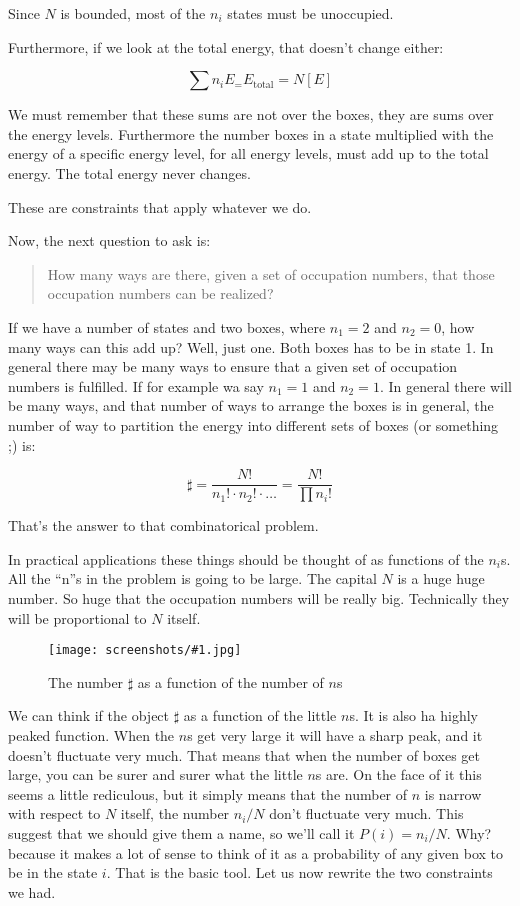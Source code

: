 \documentclass[a4, 12pt, english, USenglish]{scrreprt}
\newcommand{\screenshot}[2]{
\begin{figure}[htb]
\texttt{[image: screenshots/\#1.jpg]}
\label{#1}
\caption{#2}
\end{figure}}
\newcommand{\brackets}[1]{\ensuremath{\left[{#1}\right]}}
\begin{document}
Since \(N\) is bounded, most of the \(n_i\) states must be unoccupied.

Furthermore, if we look at the total energy, that doesn't change
either:

\[
\sum n_i E_ = E_{\mbox{total}} = N \brackets{E}
\]

We must remember that these sums are not over the boxes, they are sums
over the energy levels.  Furthermore the number boxes in a state multiplied
with the energy of a specific energy level, for all energy levels,
must add up to the total energy.  The total energy never changes.

These are constraints that apply whatever we do.

Now, the next question to ask is:

\begin{quote}
How many ways are there, given a set of occupation numbers, that those
occupation numbers can be realized?
\end{quote}

If we have a number of states and two boxes, where \(n_1 = 2\) and  \(n_2 = 0 \),
how many ways can this add up? Well, just one.  Both boxes has to be
in state 1.  In general there may be many ways to ensure that a
given set of occupation numbers is fulfilled.  If for example wa say
\(n_1 = 1\) and   \(n_2 = 1 \).  In general there will be many ways,
and that number of ways to arrange the boxes is in general, the number
of way to partition the energy into different sets of boxes (or
something ;) is:

\[
\sharp = \frac{N!}{n_1! \cdot n_2! \cdot \ldots} = \frac{N!}{\prod n_i!}
\]

That's the answer to that combinatorical problem.

In practical applications these things should be thought of as
functions of the \(n_i\)s.  All the ``n''s in the problem is going to
be large.  The capital \(N\) is a huge huge number.  So huge that the
occupation numbers will be really big.  Technically they will be
proportional to \(N\) itself.

\screenshot{peakedfunction}{The number \(\sharp\) as a function of the
  number of \(n\)s}

We can think if the object \(\sharp\) as a function of the little
\(n\)s.  It is also ha highly peaked function. When the \(n\)s get
very large it will have a sharp peak, and it doesn't fluctuate very
much.  That means that when the number of boxes get large, you can be
surer and surer what the little \(n\)s are.  On the face of it this
seems a little rediculous, but it simply means that the number of
\(n\) is narrow with respect to \(N\) itself, the number \(n_i/N\)
don't fluctuate very much.  This suggest that we should give them a
name, so we'll call it \(P(i) = n_i/N\).  Why? because it makes a lot
of sense to think of it as a probability of any given box to be in the
state \(i\).  That is the basic tool.  Let us now rewrite the two
constraints we had.  
\end{document}
